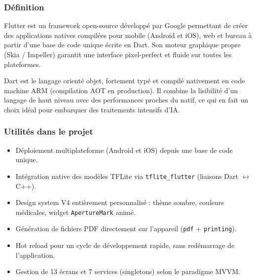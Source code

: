 \documentclass[12pt,a4paper]{report}
\begin{document}
\noindent\begin{minipage}[t]{0.66\textwidth}
\subsubsection*{Définition}
Flutter est un framework open-source développé par Google permettant de créer des applications natives compilées pour mobile (Android et iOS), web et bureau à partir d'une base de code unique écrite en Dart. Son moteur graphique propre (Skia / Impeller) garantit une interface pixel-perfect et fluide sur toutes les plateformes.

Dart est le langage orienté objet, fortement typé et compilé nativement en code machine ARM (compilation AOT en production). Il combine la lisibilité d'un langage de haut niveau avec des performances proches du natif, ce qui en fait un choix idéal pour embarquer des traitements intensifs d'IA.
\end{minipage}\hfill
\begin{minipage}[t]{0.30\textwidth}
\vspace{0pt}
\begin{center}
\end{center}
\end{minipage}

\subsubsection*{Utilités dans le projet}
\begin{itemize}
  \item Déploiement multiplateforme (Android et iOS) depuis une base de code unique.
  \item Intégration native des modèles TFLite via \texttt{tflite\_flutter} (liaisons Dart $\leftrightarrow$ C++).
  \item Design system V4 entièrement personnalisé : thème sombre, couleurs médicales, widget \texttt{ApertureMark} animé.
  \item Génération de fichiers PDF directement sur l'appareil (\texttt{pdf} + \texttt{printing}).
  \item Hot reload pour un cycle de développement rapide, sans redémarrage de l'application.
  \item Gestion de 13 écrans et 7 services (singletons) selon le paradigme MVVM.
\end{itemize}
\end{document}
